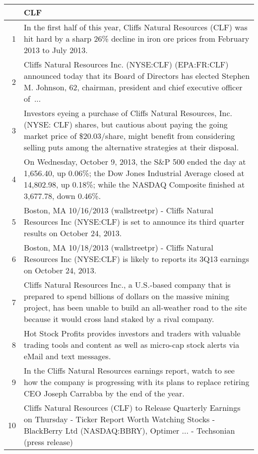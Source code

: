 \documentclass{tufte-handout}\usepackage[]{graphicx}\usepackage[]{color}
\begin{document}
\begin{tabularx}{\textwidth}{rX}
  \hline
 & CLF \\ 
  \hline
1 &  In the first half of this year, Cliffs Natural Resources (CLF) was hit hard by a sharp 26\% decline in iron ore prices from February 2013 to July 2013.  \\ 
  2 &  Cliffs Natural Resources Inc. (NYSE:CLF) (EPA:FR:CLF) announced today that its Board of Directors has elected Stephen M. Johnson, 62, chairman, president and chief executive officer of ...  \\ 
  3 &  Investors eyeing a purchase of Cliffs Natural Resources, Inc. (NYSE: CLF) shares, but cautious about paying the going market price of \$20.03/share, might benefit from considering selling puts among the alternative strategies at their disposal.  \\ 
  4 &  On Wednesday, October 9, 2013, the S\&P 500 ended the day at 1,656.40, up 0.06\%; the Dow Jones Industrial Average closed at 14,802.98, up 0.18\%; while the NASDAQ Composite finished at 3,677.78, down 0.46\%.  \\ 
  5 &  Boston, MA 10/16/2013 (wallstreetpr) - Cliffs Natural Resources Inc (NYSE:CLF) is set to announce its third quarter results on October 24, 2013.  \\ 
  6 &  Boston, MA 10/18/2013 (wallstreetpr) - Cliffs Natural Resources Inc (NYSE:CLF) is likely to reports its 3Q13 earnings on October 24, 2013.  \\ 
  7 &  Cliffs Natural Resources Inc., a U.S.-based company that is prepared to spend billions of dollars on the massive mining project, has been unable to build an all-weather road to the site because it would cross land staked by a rival company.  \\ 
  8 &  Hot Stock Profits provides investors and traders with valuable trading tools and content as well as micro-cap stock alerts via eMail and text messages.  \\ 
  9 &  In the Cliffs Natural Resources earnings report, watch to see how the company is progressing with its plans to replace retiring CEO Joseph Carrabba by the end of the year.  \\ 
  10 &  Cliffs Natural Resources (CLF) to Release Quarterly Earnings on Thursday  -  Ticker Report Worth Watching Stocks - BlackBerry Ltd (NASDAQ:BBRY), Optimer ...  -  Techsonian (press release) \\ 
   \hline
\end{tabularx}
\end{document}
